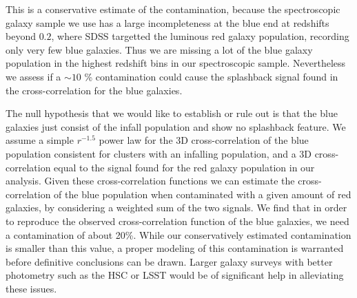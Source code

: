 \documentclass[iop, apjl, twocolappendix, numberedappendix]{emulateapj}
\begin{document}
This is a conservative estimate of the contamination, because the
spectroscopic galaxy sample we use has a large incompleteness at the
blue end at redshifts beyond $0.2$, where SDSS targetted the luminous
red galaxy population, recording only very few blue galaxies. 
Thus we are missing a lot of the blue galaxy
population in the highest redshift bins in our spectroscopic sample.
Nevertheless we assess if a $\sim 10$ \% contamination could
cause the splashback signal found in the cross-correlation for the blue galaxies.


The null hypothesis that we would like to establish or rule out is
that the blue galaxies just consist of the infall population and show
no splashback feature. We assume a simple $r^{-1.5}$ power law for the
3D cross-correlation of the blue population consistent for clusters with
an infalling population, and a 3D cross-correlation equal to the signal
found for the red galaxy population in our analysis. Given these
cross-correlation functions we can estimate the cross-correlation of
the blue population when contaminated with a given amount of red
galaxies, by considering a weighted sum of the two signals. 
We find that in order to reproduce the observed
cross-correlation function of the blue galaxies, we need a contamination
of about 20\%. While our conservatively estimated contamination is
smaller than this value, a proper modeling of this contamination is
warranted before definitive conclusions can be drawn. Larger galaxy
surveys with better photometry such as the HSC or LSST would be of
significant help in alleviating these issues.



\label{lastpage}
\end{document}
